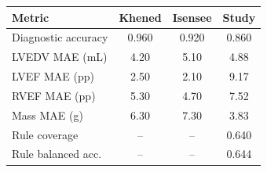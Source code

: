 \label{tab:acdc_sota_comparison}
\begin{tabularx}{\linewidth}{@{}Yccc@{}}
\toprule
\textbf{Metric} & \textbf{Khened} & \textbf{Isensee} & \textbf{Study}\\
\midrule
Diagnostic accuracy & 0.960 & 0.920 & 0.860\\
LVEDV MAE (mL) & 4.20 & 5.10 & 4.88\\
LVEF MAE (pp) & 2.50 & 2.10 & 9.17\\
RVEF MAE (pp) & 5.30 & 4.70 & 7.52\\
Mass MAE (g) & 6.30 & 7.30 & 3.83\\
Rule coverage & -- & -- & 0.640\\
Rule balanced acc. & -- & -- & 0.644\\
\bottomrule
\end{tabularx}
